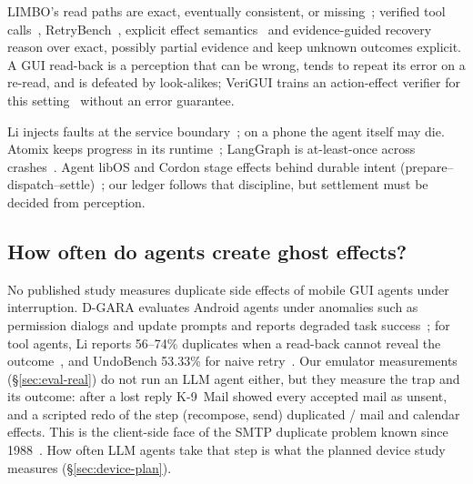  LIMBO's read paths are exact, eventually consistent, or missing~\cite{li2026exactlyonce}; verified tool calls~\cite{mansoor2026verified},
RetryBench~\cite{liu2026retrybench}, explicit effect semantics~\cite{wang2026callability} and evidence-guided recovery~\cite{zhu2026evidence} reason over exact, possibly partial
evidence and keep unknown outcomes explicit. A GUI read-back is a perception that can be wrong, tends to repeat its error on a re-read, and is defeated by look-alikes;
VeriGUI trains an action-effect verifier for this setting~\cite{zhang2026verigui} without an error guarantee.

 Li injects faults at the service boundary~\cite{li2026exactlyonce}; on a phone the agent itself may die. Atomix keeps progress
in its runtime~\cite{mohammadi2026atomix}; LangGraph is at-least-once across crashes~\cite{khan2026resume}. Agent libOS and Cordon stage effects behind durable intent
(prepare--dispatch--settle)~\cite{zhang2026agentlibos,chen2026cordon}; our ledger follows that discipline, but settlement must be decided from perception.

\subsection{How often do agents create ghost effects?}
\label{sec:measure-teaser}
No published study measures duplicate side effects of mobile GUI agents under interruption. D-GARA evaluates Android agents under anomalies such as permission dialogs and
update prompts and reports degraded task success~\cite{chen2025dgara}; for tool agents, Li reports 56--74\% duplicates when a read-back cannot reveal the outcome~\cite{li2026exactlyonce},
and UndoBench 53.33\% for naive retry~\cite{sah2026undobench}. Our emulator measurements (\S\ref{sec:eval-real}) do not run an LLM agent either, but they measure the trap and its outcome: after a lost reply K-9~Mail showed every
accepted mail as unsent, and a scripted redo of the step (recompose, send) duplicated \RealGuiDup/\RealGuiN{} mail and calendar effects. This is the client-side face of the
SMTP duplicate problem known since 1988~\cite{rfc1047}. How often LLM agents take that step is what the planned device study measures (\S\ref{sec:device-plan}).
